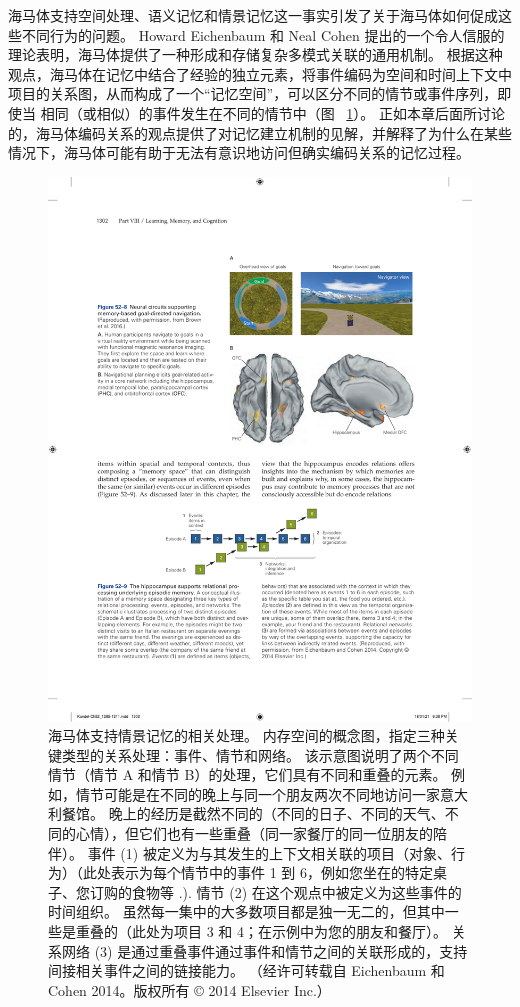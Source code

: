 海马体支持空间处理、语义记忆和情景记忆这一事实引发了关于海马体如何促成这些不同行为的问题。
Howard Eichenbaum 和 Neal Cohen 提出的一个令人信服的理论表明，海马体提供了一种形成和存储复杂多模式关联的通用机制。
根据这种观点，海马体在记忆中结合了经验的独立元素，将事件编码为空间和时间上下文中项目的关系图，从而构成了一个“记忆空间”，可以区分不同的情节或事件序列，即使当 相同（或相似）的事件发生在不同的情节中（图 ~\ref{fig:52_9}）。
正如本章后面所讨论的，海马体编码关系的观点提供了对记忆建立机制的见解，并解释了为什么在某些情况下，海马体可能有助于无法有意识地访问但确实编码关系的记忆过程。


\begin{figure}[htbp]
	\centering
	\includegraphics[width=0.55\linewidth]{chap52/fig_52_9}
	\caption{海马体支持情景记忆的相关处理。 内存空间的概念图，指定三种关键类型的关系处理：事件、情节和网络。 该示意图说明了两个不同情节（情节 A 和情节 B）的处理，它们具有不同和重叠的元素。 例如，情节可能是在不同的晚上与同一个朋友两次不同地访问一家意大利餐馆。 晚上的经历是截然不同的（不同的日子、不同的天气、不同的心情），但它们也有一些重叠（同一家餐厅的同一位朋友的陪伴）。 事件 (1) 被定义为与其发生的上下文相关联的项目（对象、行为）（此处表示为每个情节中的事件 1 到 6，例如您坐在的特定桌子、您订购的食物等 .). 情节 (2) 在这个观点中被定义为这些事件的时间组织。 虽然每一集中的大多数项目都是独一无二的，但其中一些是重叠的（此处为项目 3 和 4；在示例中为您的朋友和餐厅）。 关系网络 (3) 是通过重叠事件通过事件和情节之间的关联形成的，支持间接相关事件之间的链接能力。 （经许可转载自 Eichenbaum 和 Cohen 2014。版权所有 © 2014 Elsevier Inc.）}
	\label{fig:52_9}
\end{figure}



